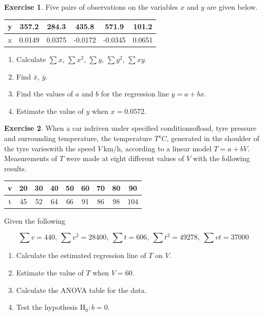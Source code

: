 \documentclass[
]{book}
\theoremstyle{definition}
\theoremstyle{definition}
\theoremstyle{definition}
\newtheorem{exercise}{Exercise}[chapter]
\theoremstyle{definition}
\theoremstyle{remark}
\begin{document}
\begin{exercise}

Five pairs of observations on the variables \(x\) and \(y\) are given below.

\begin{longtable}[]{@{}cccccc@{}}
\toprule
y & 357.2 & 284.3 & 435.8 & 571.9 & 101.2\tabularnewline
\midrule
\endhead
x & 0.0149 & 0.0375 & -0.0172 & -0.0345 & 0.0651\tabularnewline
\bottomrule
\end{longtable}

\begin{enumerate}
\def\labelenumi{\alph{enumi})}
\item
  Calculate \(\sum x\), \(\sum x^2\), \(\sum y\), \(\sum y^2\), \(\sum xy\).
\item
  Find \(\bar{x}\), \(\bar{y}\).
\item
  Find the values of \(a\) and \(b\) for the regression line \(y=a+bx\).
\item
  Estimate the value of \(y\) when \(x=0.0572\).
\end{enumerate}

\end{exercise}

\begin{exercise}

When a car isdriven under specified conditionsofload, tyre pressure and surrounding temperature, the temperature \(T^{o}C\), generated in the shoulder of the tyre varieswith the speed \(V \ \text{km}/\text{h}\), according to a linear model \(T=a+bV\). Measurements of \(T\) were made at eight different values of \(V\) with the following results.

\begin{longtable}[]{@{}ccccccccc@{}}
\toprule
v & 20 & 30 & 40 & 50 & 60 & 70 & 80 & 90\tabularnewline
\midrule
\endhead
t & 45 & 52 & 64 & 66 & 91 & 86 & 98 & 104\tabularnewline
\bottomrule
\end{longtable}

Given the following

\[\sum v = 440, \ \sum v^2 = 28400, \ \sum t =606, \ \sum t^2 = 49278, \ \sum vt = 37000 \]

\begin{enumerate}
\def\labelenumi{\alph{enumi})}
\item
  Calculate the estimated regression line of \(T\) on \(V\).
\item
  Estimate the value of \(T\) when \(V=60\).
\item
  Calculate the ANOVA table for the data.
\item
  Test the hypothesis \(\text{H}_0: b=0\).
\end{enumerate}

\end{exercise}
\end{document}

